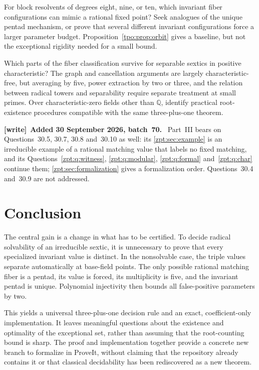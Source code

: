 \documentclass[11pt,letterpaper]{article}
\numberwithin{equation}{section}
\theoremstyle{definition}
\theoremstyle{remark}
\newcommand{\QQ}{\mathbb Q}
\newenvironment{writenote}[1][]{\par\smallskip\begingroup\small
 \noindent\textbf{[write]}\if\relax\detokenize{#1}\relax\else~\textbf{#1.}\fi\ }%
 {\par\endgroup\smallskip}
\begin{document}
\begin{question}
For block resolvents of degrees eight, nine, or ten, which invariant fiber
configurations can mimic a rational fixed point? Seek analogues of the unique
pentad mechanism, or prove that several different invariant configurations
force a larger parameter budget. Proposition~\ref{tpo:prop:orbit} gives a
baseline, but not the exceptional rigidity needed for a small bound.
\end{question}

\begin{question}
Which parts of the fiber classification survive for separable sextics in
positive characteristic? The graph and cancellation arguments are largely
characteristic-free, but averaging by five, power extraction by two or three,
and the relation between radical towers and separability require separate
treatment at small primes. Over characteristic-zero fields other than $\QQ$,
identify practical root-existence procedures compatible with the same
three-plus-one theorem.
\end{question}

\begin{writenote}[Added 30 September 2026, batch~70]
Part~III bears on Questions~30.5, 30.7, 30.8 and~30.10 as well: its
\cref{zpt:sec:example} is an irreducible example of a rational matching
value that labels no fixed matching, and its
Questions~\ref{zpt:q:witness}, \ref{zpt:q:modular}, \ref{zpt:q:formal}
and~\ref{zpt:q:char} continue them; \cref{zpt:sec:formalization} gives a
formalization order. Questions~30.4 and~30.9 are not addressed.
\end{writenote}

\section{Conclusion}

The central gain is a change in what has to be certified. To decide radical
solvability of an irreducible sextic, it is unnecessary to prove that every
specialized invariant value is distinct. In the nonsolvable case, the triple
values separate automatically at base-field points. The only possible
rational matching fiber is a pentad, its value is forced, its multiplicity is
five, and the invariant pentad is unique. Polynomial injectivity then bounds
all false-positive parameters by two.

This yields a universal three-plus-one decision rule and an exact,
coefficient-only implementation. It leaves meaningful questions about the
existence and optimality of the exceptional set, rather than assuming that
the root-counting bound is sharp. The proof and implementation together provide
a concrete new branch to formalize in ProveIt, without claiming that the
repository already contains it or that classical decidability has been
rediscovered as a new theorem.
\end{document}
